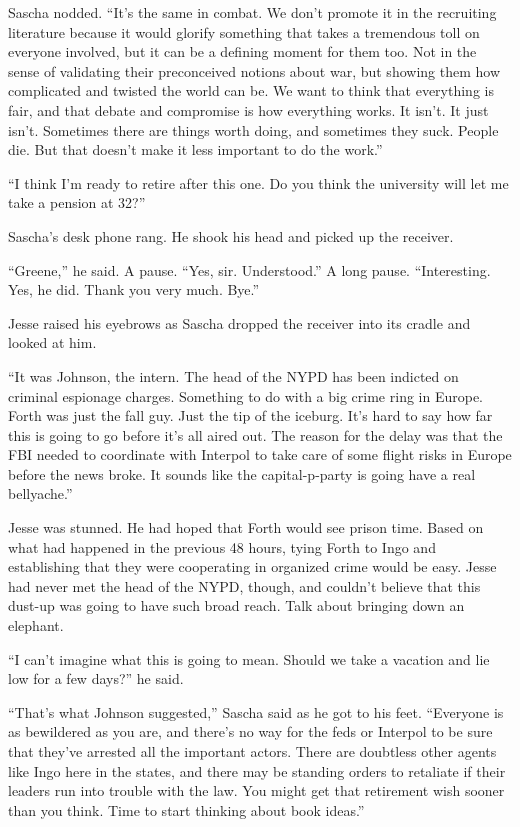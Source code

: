 \documentclass[12pt]{book}
\begin{document}
Sascha nodded.  ``It's the same in combat.  We don't promote it in the recruiting literature because it would glorify something that takes a tremendous toll on everyone involved, but it can be a defining moment for them too.  Not in the sense of validating their preconceived notions about war, but showing them how complicated and twisted the world can be.  We want to think that everything is fair, and that debate and compromise is how everything works.  It isn't.  It just isn't.  Sometimes there are things worth doing, and sometimes they suck.  People die.  But that doesn't make it less important to do the work.''

``I think I'm ready to retire after this one.  Do you think the university will let me take a pension at 32?''

Sascha's desk phone rang.  He shook his head and picked up the receiver.

``Greene,'' he said.  A pause.  ``Yes, sir.  Understood.''  A long pause.  ``Interesting.  Yes, he did.  Thank you very much.  Bye.''

Jesse raised his eyebrows as Sascha dropped the receiver into its cradle and looked at him.

``It was Johnson, the intern.  The head of the NYPD has been indicted on criminal espionage charges.  Something to do with a big crime ring in Europe.  Forth was just the fall guy.  Just the tip of the iceburg.  It's hard to say how far this is going to go before it's all aired out.  The reason for the delay was that the FBI needed to coordinate with Interpol to take care of some flight risks in Europe before the news broke.  It sounds like the capital-p-party is going have a real bellyache.''

Jesse was stunned.  He had hoped that Forth would see prison time.  Based on what had happened in the previous 48 hours, tying Forth to Ingo and establishing that they were cooperating in organized crime would be easy.  Jesse had never met the head of the NYPD, though, and couldn't believe that this dust-up was going to have such broad reach.  Talk about bringing down an elephant.

``I can't imagine what this is going to mean.  Should we take a vacation and lie  low for a few days?'' he said.

``That's what Johnson suggested,'' Sascha said as he got to his feet.  ``Everyone is as bewildered as you are, and there's no way for the feds or Interpol to be sure that they've arrested all the important actors.  There are doubtless other agents like Ingo here in the states, and there may be standing orders to retaliate if their leaders run into trouble with the law.  You might get that retirement wish sooner than you think.  Time to start thinking about book ideas.''
\end{document}
